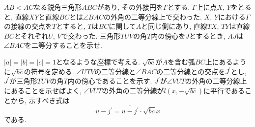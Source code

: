 \begin{bprb}[ISL2024-G6]
$AB<AC$なる鋭角三角形$ABC$があり, その外接円を$\Gamma$とする.
$\Gamma$上に点$X$, $Y$をとると, 直線$XY$と直線$BC$とは$\angle BAC$の外角の二等分線上で交わった.
$X$, $Y$における$\Gamma$の接線の交点を$T$とすると, $T$は$BC$に関して$A$と同じ側にあり, 直線$TX$, $TY$は直線$BC$とそれぞれ$U$, $V$で交わった.
三角形$TUV$の角$T$内の傍心を$J$とするとき, $AJ$は$\angle BAC$を二等分することを示せ.
\end{bprb}
\begin{ifsol*}
$\lvert a\rvert=\lvert b\rvert=\lvert c\rvert=1$となるような座標で考える.
$\sqrt{bc}$が$A$を含む弧$BC$上にあるように$\sqrt{bc}$の符号を定める.
$\angle UTV$の二等分線と$\angle BAC$の二等分線との交点を$J^\prime$とし, $J^\prime$が三角形$TUV$の角$T$内の傍心であることを示す.
$J^\prime$が$\angle VUT$の外角の二等分線上にあることを示せばよく, $\angle VUT$の外角の二等分線が$l(x,-\sqrt{bc})$に平行であることから, 示すべき式は
\[u-j^\prime=\overline{u-j^\prime}\cdot\sqrt{bc}x\]
である.


\end{ifsol*}

